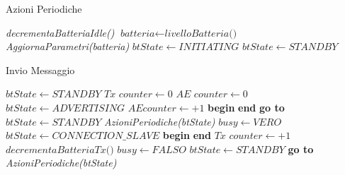 \bigskip
\begin{algorithm}[bh]
	\caption{Azioni Periodiche}\label{alg:periodic_actions}
	\begin{algorithmic}[1]
			\State \textit{decrementaBatteriaIdle()}
			\State $ \textit{batteria} \gets \textit{livelloBatteria() } $
				\State \textit{AggiornaParametri(\textit{batteria})}
					\State $ \textit{btState} \gets INITIATING $
				\EndIf
			\Else
				\State $ \textit{btState} \gets STANDBY $
			\EndIf
		\EndFunction
	\end{algorithmic}
\end{algorithm}
\bigskip
\begin{algorithm}[hp]
	\caption{Invio Messaggio}\label{alg:invia_msg}
	\begin{algorithmic}[1]
				\State $ \textit{btState} \gets STANDBY$
			\EndIf
		\State $ \textit{Tx counter} \gets 0 $ 
		\Label {}
		\State $ \textit{AE counter} \gets 0 $ 
		\State $ \textit{btState} \gets ADVERTISING$
		\State $ AE counter \gets +1 $
		\State \textbf{begin}
			\State\hspace{\algorithmicindent}{ADVERTISING EVENT}
		\State \textbf{end}
				\State \textbf{go to} 
			\Else
				\State $btState \gets STANDBY$
				\State \textit{AzioniPeriodiche(btState)}
			\EndIf
		\EndIf
		\State $ \textit{busy}\gets VERO $
		\State $\textit{btState}\gets CONNECTION\_SLAVE$
		\State \textbf{begin}
			\State\hspace{\algorithmicindent}{CONNECTION EVENT}
		\State \textbf{end}
		\State $\textit{Tx counter}\gets +1$
		\State $ \textit{decrementaBatteriaTx()}$
		\State $\textit{busy}\gets FALSO$
		\State $ \textit{btState}\gets STANDBY $
			\State \textbf{go to} 
		\Else
			\State \textit{AzioniPeriodiche(btState)}
		\EndIf
		\EndFunction
	\end{algorithmic}
\end{algorithm}
\bigskip

